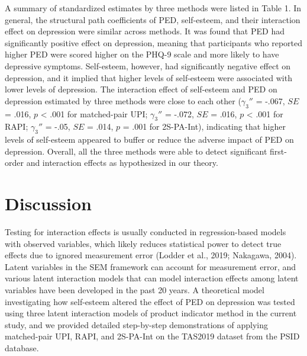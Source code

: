 \documentclass[
  man]{apa7}
\begin{document}
A summary of standardized estimates by three methods were listed in Table 1. In general, the structural path coefficients of PED, self-esteem, and their interaction effect on depression were similar across methods. It was found that PED had significantly positive effect on depression, meaning that participants who reported higher PED were scored higher on the PHQ-9 scale and more likely to have depressive symptoms. Self-esteem, however, had significantly negative effect on depression, and it implied that higher levels of self-esteem were associated with lower levels of depression. The interaction effect of self-esteem and PED on depression estimated by three methods were close to each other (\(\gamma_{3}''\) = -.067, \(\textit{SE}\) = .016, \(\textit{p}\) \textless{} .001 for matched-pair UPI; \(\gamma_{3}''\) = -.072, \(\textit{SE}\) = .016, \(\textit{p}\) \textless{} .001 for RAPI; \(\gamma_{3}''\) = -.05, \(\textit{SE}\) = .014, \(\textit{p}\) = .001 for 2S-PA-Int), indicating that higher levels of self-esteem appeared to buffer or reduce the adverse impact of PED on depression. Overall, all the three methods were able to detect significant first-order and interaction effects as hypothesized in our theory.

\hypertarget{discussion}{%
\section{Discussion}\label{discussion}}

Testing for interaction effects is usually conducted in regression-based models with observed variables, which likely reduces statistical power to detect true effects due to ignored measurement error (Lodder et al., 2019; Nakagawa, 2004). Latent variables in the SEM framework can account for measurement error, and various latent interaction models that can model interaction effects among latent variables have been developed in the past 20 years. A theoretical model investigating how self-esteem altered the effect of PED on depression was tested using three latent interaction models of product indicator method in the current study, and we provided detailed step-by-step demonstrations of applying matched-pair UPI, RAPI, and 2S-PA-Int on the TAS2019 dataset from the PSID database.
\end{document}
